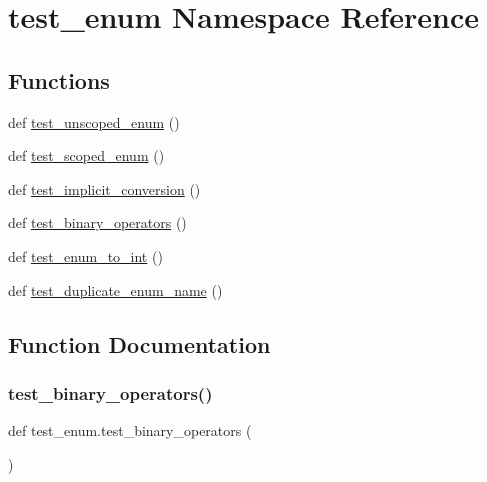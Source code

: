 \hypertarget{namespacetest__enum}{}\section{test\+\_\+enum Namespace Reference}
\label{namespacetest__enum}
\subsection*{Functions}
\begin{DoxyCompactItemize}
\item 
def \mbox{\hyperlink{namespacetest__enum_af1757cef01faa8f3c0ac8293a9beed52}{test\+\_\+unscoped\+\_\+enum}} ()
\item 
def \mbox{\hyperlink{namespacetest__enum_ab55d4b1ff032fd4948383b6ba6c722e7}{test\+\_\+scoped\+\_\+enum}} ()
\item 
def \mbox{\hyperlink{namespacetest__enum_af37cf22e43b809f96c9432ab1310eb7b}{test\+\_\+implicit\+\_\+conversion}} ()
\item 
def \mbox{\hyperlink{namespacetest__enum_a4988fb0784d9630243609a2f2d37d918}{test\+\_\+binary\+\_\+operators}} ()
\item 
def \mbox{\hyperlink{namespacetest__enum_a6c30bea0f935ac0caee89880be2a8765}{test\+\_\+enum\+\_\+to\+\_\+int}} ()
\item 
def \mbox{\hyperlink{namespacetest__enum_afb1ba9262afcdf3e6c62ad6b5d1bac9a}{test\+\_\+duplicate\+\_\+enum\+\_\+name}} ()
\end{DoxyCompactItemize}


\subsection{Function Documentation}
\mbox{\label{namespacetest__enum_a4988fb0784d9630243609a2f2d37d918}} 
\subsubsection{\texorpdfstring{test\_binary\_operators()}{test\_binary\_operators()}}
{\footnotesize\ttfamily def test\+\_\+enum.\+test\+\_\+binary\+\_\+operators (\begin{DoxyParamCaption}{ }\end{DoxyParamCaption})}

